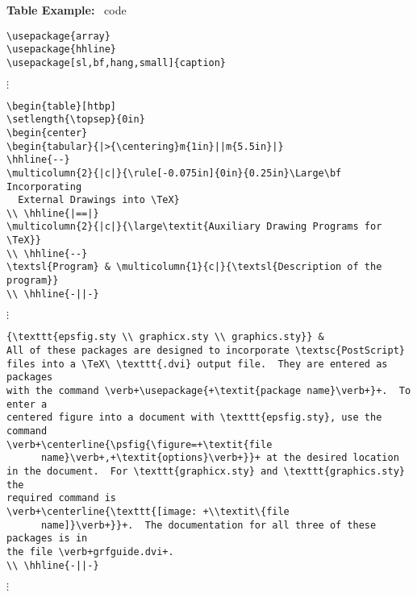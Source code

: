 \documentclass[11pt,titlepage]{article}
\begin{document}
\noindent\textbf{Table Example:} \LaTeXe\ code
%
\vspace{-\parskip}
\begin{verbatim}
\usepackage{array}
\usepackage{hhline}
\usepackage[sl,bf,hang,small]{caption}
\end{verbatim}
%
\vspace{-1.25\parskip}
\hspace{1em}$\vdots$
\vspace{-1.25\parskip}
%
\begin{verbatim}
\begin{table}[htbp]
\setlength{\topsep}{0in}
\begin{center}
\begin{tabular}{|>{\centering}m{1in}||m{5.5in}|}
\hhline{--}
\multicolumn{2}{|c|}{\rule[-0.075in]{0in}{0.25in}\Large\bf Incorporating
  External Drawings into \TeX}
\\ \hhline{|==|}
\multicolumn{2}{|c|}{\large\textit{Auxiliary Drawing Programs for \TeX}} 
\\ \hhline{--}
\textsl{Program} & \multicolumn{1}{c|}{\textsl{Description of the program}}
\\ \hhline{-||-}
\end{verbatim}
%
\vspace{-1.25\parskip}
\hspace{1em}$\vdots$
\vspace{-1.25\parskip}
%
\begin{verbatim}
{\texttt{epsfig.sty \\ graphicx.sty \\ graphics.sty}} & 
All of these packages are designed to incorporate \textsc{PostScript}
files into a \TeX\ \texttt{.dvi} output file.  They are entered as packages
with the command \verb+\usepackage{+\textit{package name}\verb+}+.  To enter a
centered figure into a document with \texttt{epsfig.sty}, use the command
\verb+\centerline{\psfig{\figure=+\textit{file
      name}\verb+,+\textit{options}\verb+}}+ at the desired location
in the document.  For \texttt{graphicx.sty} and \texttt{graphics.sty} the
required command is
\verb+\centerline{\texttt{[image: +\\textit\{file
      name]}\verb+}}+.  The documentation for all three of these packages is in
the file \verb+grfguide.dvi+.
\\ \hhline{-||-}
\end{verbatim}
%
\vspace{-1.25\parskip}
\hspace{1em}$\vdots$
\vspace{-1.25\parskip}
\end{document}
